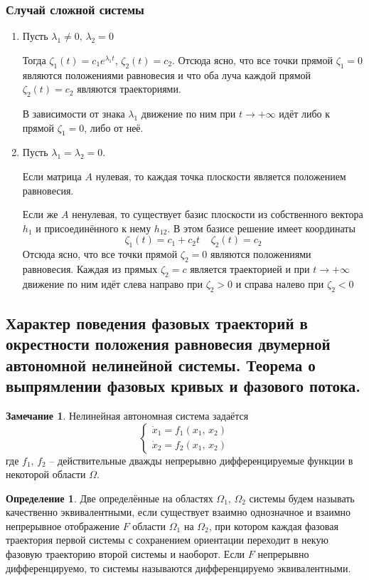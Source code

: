 \documentclass[a4paper,12pt]{article}
\theoremstyle{plain}
\theoremstyle{definition}
\newtheorem{definition}{Определение}[section]
\newtheorem*{note}{Замечание}
\theoremstyle{remark}
\begin{document}
\subsubsection*{Случай сложной системы}
\begin{enumerate}
	\item Пусть $\lambda_1 \neq 0,\, \lambda_2 = 0$

	      Тогда $\zeta_1(t) = c_1e^{\lambda_1 t},\, \zeta_2(t) = c_2$. Отсюда ясно, что все точки прямой $\zeta_1 = 0$ являются положениями равновесия и что оба луча каждой прямой $\zeta_2(t) = c_2$ являются траекториями.

	      В зависимости от знака $\lambda_1$ движение по ним при $t \to +\infty$ идёт либо к прямой $\zeta_1 = 0$, либо от неё.
	\item Пусть $\lambda_1 = \lambda_2 = 0$.

	      Если матрица $A$ нулевая, то каждая точка плоскости является положением равновесия.

	      Если же $A$ ненулевая, то существует базис плоскости из собственного вектора $h_1$ и присоединённого к нему $h_{12}$. В этом базисе решение имеет координаты
	      \[\zeta_1(t) = c_1 + c_2t\;\;\;\; \zeta_2(t) = c_2\]
	      Отсюда ясно, что все точки прямой $\zeta_2 = 0$ являются положениями равновесия. Каждая из прямых $\zeta_2 = c$ является траекторией и при $t \to +\infty$ движение по ним идёт слева направо при $\zeta_2 > 0$ и справа налево при $\zeta_2 < 0$
\end{enumerate}

\subsection{Характер поведения фазовых траекторий в окрестности положения равновесия двумерной автономной нелинейной системы. Теорема о выпрямлении фазовых кривых и фазового потока.}
\begin{note}
	Нелинейная автономная система задаётся
	\[\begin{cases}
			\dot{x}_1 = f_1(x_1,\,x_2) \\
			\dot{x}_2 = f_2(x_1,\,x_2)
		\end{cases}\]
	где $f_1,\,f_2$ -- действительные дважды непрерывно дифференцируемые функции в некоторой области $\Omega$.
\end{note}

\begin{definition}
	Две определённые на областях $\Omega_1,\, \Omega_2$ системы будем называть качественно эквивалентными, если существует взаимно однозначное и взаимно непрерывное отображение $F$ области $\Omega_1$ на $\Omega_2$, при котором каждая фазовая траектория первой системы с сохранением ориентации переходит в некую фазовую траекторию второй системы и наоборот. Если $F$ непрерывно дифференцируемо, то системы называются дифференцируемо эквивалентными.
\end{definition}
\end{document}
